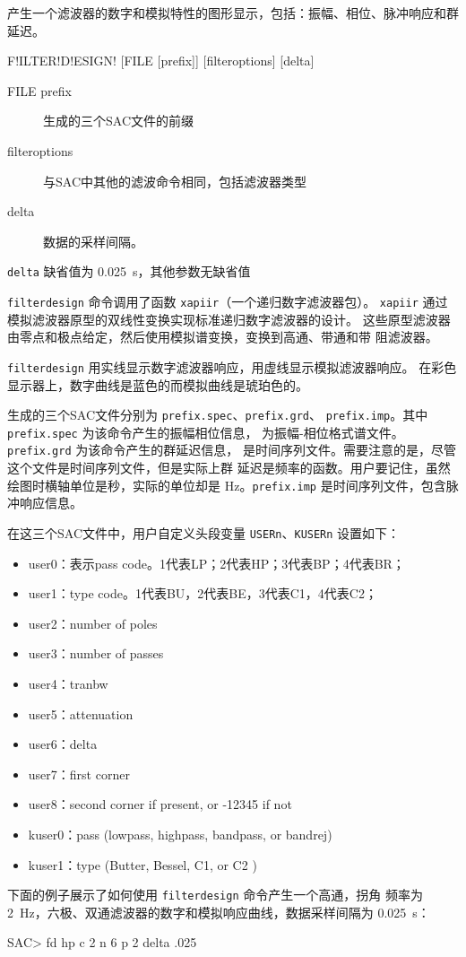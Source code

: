 \label{cmd:filterdesign}

产生一个滤波器的数字和模拟特性的图形显示，包括：振幅、相位、脉冲响应和群延迟。

\begin{SACSTX}
F!ILTER!D!ESIGN! [FILE [prefix]] [filteroptions] [delta]
\end{SACSTX}

\begin{description}
\item [FILE prefix] 生成的三个SAC文件的前缀
\item [filteroptions] 与SAC中其他的滤波命令相同，包括滤波器类型
\item [delta] 数据的采样间隔。
\end{description}

\texttt{delta} 缺省值为 \SI{0.025}{\s}，其他参数无缺省值

\texttt{filterdesign} 命令调用了函数 \texttt{xapiir}（一个递归数字滤波器包）。
\texttt{xapiir} 通过模拟滤波器原型的双线性变换实现标准递归数字滤波器的设计。
这些原型滤波器由零点和极点给定，然后使用模拟谱变换，变换到高通、带通和带
阻滤波器。

\texttt{filterdesign} 用实线显示数字滤波器响应，用虚线显示模拟滤波器响应。
在彩色显示器上，数字曲线是蓝色的而模拟曲线是琥珀色的。

生成的三个SAC文件分别为 \texttt{prefix.spec}、\texttt{prefix.grd}、
\texttt{prefix.imp}。其中 \texttt{prefix.spec} 为该命令产生的振幅相位信息，
为振幅-相位格式谱文件。\texttt{prefix.grd} 为该命令产生的群延迟信息，
是时间序列文件。需要注意的是，尽管这个文件是时间序列文件，但是实际上群
延迟是频率的函数。用户要记住，虽然绘图时横轴单位是秒，实际的单位却是
\si{\Hz}。\texttt{prefix.imp} 是时间序列文件，包含脉冲响应信息。

在这三个SAC文件中，用户自定义头段变量 \texttt{USERn}、\texttt{KUSERn} 设置如下：
\begin{itemize}
\item user0：表示pass code。1代表LP；2代表HP；3代表BP；4代表BR；
\item user1：type code。1代表BU，2代表BE，3代表C1，4代表C2；
\item user2：number of poles
\item user3：number of passes
\item user4：tranbw
\item user5：attenuation
\item user6：delta
\item user7：first corner
\item user8：second corner if present, or -12345 if not
\item kuser0：pass (lowpass, highpass, bandpass, or bandrej)
\item kuser1：type (Butter, Bessel, C1, or C2 )
\end{itemize}

下面的例子展示了如何使用 \texttt{filterdesign} 命令产生一个高通，拐角
频率为 \SI{2}{\Hz}，六极、双通滤波器的数字和模拟响应曲线，数据采样间隔为
\SI{0.025}{\s}：
\begin{SACCode}
SAC> fd hp c 2 n 6 p 2 delta .025
\end{SACCode}
